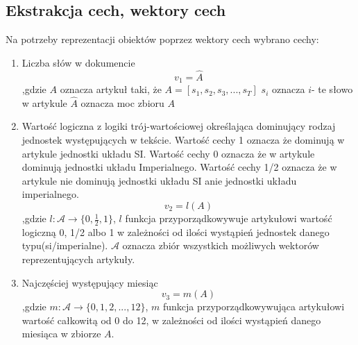\documentclass{classrep}
\begin{document}
\subsection{Ekstrakcja cech, wektory cech}
Na potrzeby reprezentacji obiektów poprzez wektory cech wybrano cechy:
\begin{enumerate}

\item Liczba słów w dokumencie
\begin{equation}
v_{1}=\hat{A}\label{eq:eps}
\end{equation}
,gdzie 
\newline $A$ oznacza artykuł taki, że $A=[s_1,s_2,s_3,. . . ,s_T]$
\newline $s_i$ oznacza $i$- te słowo w artykule
\newline $\hat{A}$ oznacza moc zbioru $A$

\item Wartość logiczna z logiki trój-wartościowej określająca dominujący rodzaj jednostek występujących w tekście. Wartość cechy 1 oznacza że dominują w artykule jednostki układu SI. Wartość cechy 0 oznacza że w artykule dominują jednostki układu Imperialnego. Wartość cechy 1/2 oznacza że w artykule nie dominują jednostki układu SI anie jednostki układu imperialnego.
\begin{equation}
v_{2}=l(A) \label{eq:eps}
\end{equation}
,gdzie
\newline $l:\mathcal{A} \rightarrow \{0,\frac{1}{2},1\}$, $l$ funkcja przyporządkowywuje artykułowi wartość logiczną 0, 1/2 albo 1 w zależności od ilości wystąpień jednostek danego typu(si/imperialne).
\newline $\mathcal{A}$ oznacza zbiór wszystkich możliwych wektorów reprezentujących artykuły.

\item Najczęściej występujący miesiąc
\begin{equation}
v_{3}=m(A) \label{eq:eps}
\end{equation}
,gdzie
\newline $m:\mathcal{A} \rightarrow \{0,1,2,. . . ,12\}$, $m$ funkcja przyporządkowywująca artykułowi wartość całkowitą od 0 do 12, w zależności od ilości wystąpień danego miesiąca w zbiorze $A$.



\end{enumerate}
\end{document}
